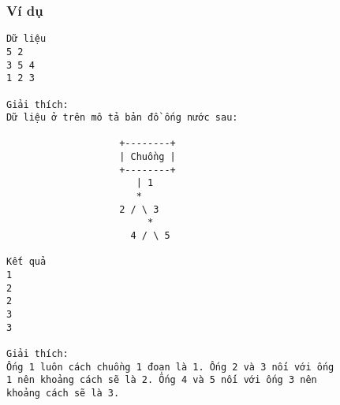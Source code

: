 \subsubsection{   Ví dụ  }
\begin{verbatim}
Dữ liệu
5 2
3 5 4
1 2 3

Giải thích:
Dữ liệu ở trên mô tả bản đồ ống nước sau:

                    +--------+
                    | Chuồng |
                    +--------+
                       | 1
                       *
                    2 / \ 3
                         *
                      4 / \ 5

Kết quả
1
2
2
3
3

Giải thích:
Ống 1 luôn cách chuồng 1 đoạn là 1. Ống 2 và 3 nối với ống 
1 nên khoảng cách sẽ là 2. Ống 4 và 5 nối với ống 3 nên 
khoảng cách sẽ là 3.
\end{verbatim}
